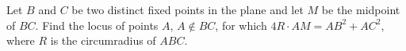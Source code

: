 Let $B$ and $C$ be two distinct fixed points in the plane and let $M$ be the midpoint of $BC$.
Find the locus of points $A$, $A \not\in BC$, for which $4R \cdot AM = AB^2 + AC^2$, where $R$ is the circumradius of $ABC$.
